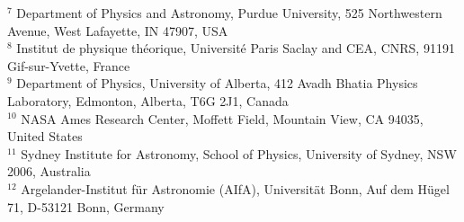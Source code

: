 \documentclass[useAMS,usenatbib]{mnras}
\begin{document}
{$^{7}$ {Department of Physics and Astronomy, Purdue University, 525 Northwestern Avenue, West Lafayette, IN 47907, USA}\\
$^{8}$ {Institut de physique th\'eorique, Universit\'e Paris Saclay and CEA, CNRS, 91191 Gif-sur-Yvette, France}\\
$^{9}$ {Department of Physics, University of Alberta, 412 Avadh Bhatia Physics Laboratory, Edmonton, Alberta, T6G 2J1, Canada}\\
$^{10}$ {NASA Ames Research Center, Moffett Field, Mountain View, CA 94035, United States}\\
$^{11}$ {Sydney Institute for Astronomy, School of Physics, University of Sydney, NSW 2006, Australia}\\
$^{12}$ {Argelander-Institut f\"ur Astronomie (AIfA), Universit\"at Bonn, Auf dem H\"ugel 71, D-53121 Bonn, Germany}
%
}
\date{submitted:  2017, accepted: }

\maketitle

\end{document}
